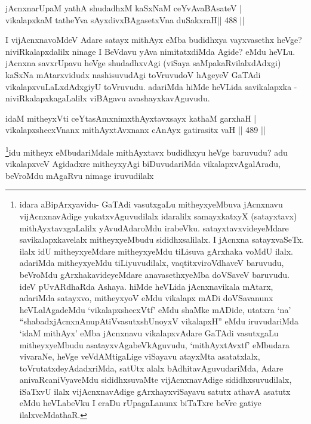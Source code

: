 \begin{shl}
\footnotemark[2]jAcnxnarUpaM yathA shudadhxM kaSxNaM ceYvAvaBAsateV | \\
vikalapxkaM tatheYva sAyxdivxBAgasetxVna duSakxraH\hfill ||  488 ||  
\end{shl}

\begin{artha}
I vijAcnxnavoMdeV Adare satayx mithAyx eMba budidhxya vayxvasethx heVge? niviRkalapxdalilx ninage I BeVdavu yAva nimitatxdiMda Agide? eMdu heVLu. jAcnxna savxrUpavu heVge shudadhxvAgi (viSaya saMpakaRvilalxdAdxgi) kaSxNa mAtarxvidudx nashisuvudAgi toVruvudoV hAgeyeV GaTAdi vikalapxvuLaLxdAdxgiyU toVruvudu. adariMda hiMde heVLida savikalapxka - niviRkalapxkagaLalilx viBAgavu avashayxkavAguvudu.
\end{artha}

\begin{shl}
idaM mitheyxVti ceYtasAmxnimxthAyxtavxsayx kathaM garxhaH | \\
vikalapxshecxVnanx mithAyxtAvxnanx cAnAyx gatirasitx vaH \hfill||  489 ||  
\end{shl}

\begin{artha}
\footnote{idara aBipArxyavidu- GaTAdi vasutxgaLu mitheyxyeMbuva jAcnxnavu vijAcnxnavAdige yukatxvAguvudilalx idaralilx samayxkatxyX (satayxtavx) mithAyxtavxgaLalilx yAvudAdaroMdu irabeVku. satayxtavxvideyeMdare savikalapxkavelalx mitheyxyeMbudu sididhxsalilalx. I jAcnxna satayxvaSeTx. ilalx idU mitheyxyeMdare mitheyxyeMdu tiLisuva gArxhaka voMdU ilalx. adariMda mitheyxyeMdu tiLiyuvudilalx, vaqtitxviroVdhaveV baruvudu, beVroMdu gArxhakavideyeMdare anavasethxyeMba doVSaveV baruvudu. ideV pUvARdhaRda Ashaya. hiMde heVLida jAcnxnavikala mAtarx, adariMda satayxvo, mitheyxyoV eMdu vikalapx mADi doVSavanunx heVLalAgadeMdu `vikalapxshecxVtf' eMdu shaMke mADide, utatxra `na' ``shabadxjAcnxnAnupAtiVvasutxshUnoyxV vikalapxH'' eMdu iruvudariMda `idaM mithAyx' eMba jAcnxnavu vikalapxvAdare GaTAdi vasutxgaLu mitheyxyeMbudu asatayxvAgabeVkAguvudu, `mithAyxtAvxtf' eMbudara vivaraNe, heVge veVdAMtigaLige viSayavu atayxMta asatatxlalx, toVrutatxdeyAdadxriMda, satUtx alalx bAdhitavAguvudariMda, Adare anivaRcaniVyaveMdu sididhxsuvaMte vijAcnxnavAdige sididhxsuvudilalx, iSaTxvU ilalx vijAcnxnavAdige gArxhayxviSayavu satutx athavA asatutx eMdu heVLabeVku I eraDu rUpagaLanunx biTaTxre beVre gatiye ilalxveMdathaR.}idu mitheyx eMbudariMdale mithAyxtavx budidhxyu heVge baruvudu? adu vikalapxveV Agidadxre mitheyxyAgi biDuvudariMda vikalapxvAgalAradu, beVroMdu mAgaRvu nimage iruvudilalx
\end{artha}

